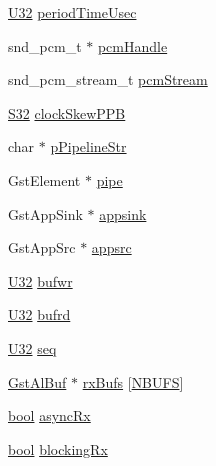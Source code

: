 \begin{DoxyCompactItemize}
\item 
\hyperlink{openavb__types__base__pub_8h_a696390429f2f3b644bde8d0322a24124}{U32} \hyperlink{structpvt__data__t_a69ce66331b71bec8c96ed76d23b3ce1e}{period\+Time\+Usec}
\item 
snd\+\_\+pcm\+\_\+t $\ast$ \hyperlink{structpvt__data__t_a1b42323846f53777096f18d2f5ec8b04}{pcm\+Handle}
\item 
snd\+\_\+pcm\+\_\+stream\+\_\+t \hyperlink{structpvt__data__t_afddbe34322b5c451479ff1fe39b8292d}{pcm\+Stream}
\item 
\hyperlink{openavb__types__base__pub_8h_a39c786017723555afb9e8b85accec0de}{S32} \hyperlink{structpvt__data__t_a6d2532ea1bdd6efc2c3169f155371167}{clock\+Skew\+P\+PB}
\item 
char $\ast$ \hyperlink{structpvt__data__t_a1f92697b6354d417c841cb4cfdde7bf9}{p\+Pipeline\+Str}
\item 
Gst\+Element $\ast$ \hyperlink{structpvt__data__t_a14ebdf8573bc2c62435241226711f72b}{pipe}
\item 
Gst\+App\+Sink $\ast$ \hyperlink{structpvt__data__t_a3831070f5306380e16c589d7035c5409}{appsink}
\item 
Gst\+App\+Src $\ast$ \hyperlink{structpvt__data__t_a2475dfe3881dd35d1bee8401968eb94c}{appsrc}
\item 
\hyperlink{openavb__types__base__pub_8h_a696390429f2f3b644bde8d0322a24124}{U32} \hyperlink{structpvt__data__t_a6e3073aaafcbd8710b961fb5c6abaa37}{bufwr}
\item 
\hyperlink{openavb__types__base__pub_8h_a696390429f2f3b644bde8d0322a24124}{U32} \hyperlink{structpvt__data__t_acd45abda66e653e7f074a5409b9f5ab9}{bufrd}
\item 
\hyperlink{openavb__types__base__pub_8h_a696390429f2f3b644bde8d0322a24124}{U32} \hyperlink{structpvt__data__t_ae362e320c7f4215efa6d55020460d4db}{seq}
\item 
\hyperlink{gst__al_8h_a4d621244d269b98904a6b823e809de1c}{Gst\+Al\+Buf} $\ast$ \hyperlink{structpvt__data__t_a09519ac87178600714ff77d2ab52af61}{rx\+Bufs} \mbox{[}\hyperlink{openavb__intf__mjpeg__gst_8c_ae49d3dcde34269528cbfb59fec639621}{N\+B\+U\+FS}\mbox{]}
\item 
\hyperlink{avb__gptp_8h_af6a258d8f3ee5206d682d799316314b1}{bool} \hyperlink{structpvt__data__t_aa9728e7b327a4793c5732449b91c8fc6}{async\+Rx}
\item 
\hyperlink{avb__gptp_8h_af6a258d8f3ee5206d682d799316314b1}{bool} \hyperlink{structpvt__data__t_ac9f9861cdcfd729be77d74ec2dde36fe}{blocking\+Rx}
\item 

\end{DoxyCompactItemize}
